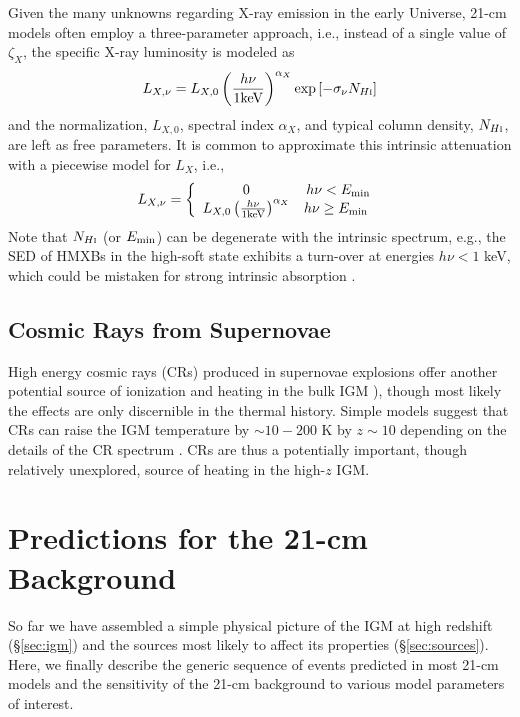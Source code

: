 Given the many unknowns regarding X-ray emission in the early Universe, 21-cm models often employ a three-parameter approach, i.e., instead of a single value of $\zeta_X$, the specific X-ray luminosity is modeled as 
\begin{equation}
	L_{X,\nu} = L_{X,0} \left(\frac{h \nu}{1 \mathrm{keV}} \right)^{\alpha_X} \exp\left[-\sigma_{\nu} N_{H\textsc{i}} \right]
\end{equation}
and the normalization, $L_{X,0}$, spectral index $\alpha_X$, and typical column density, $N_{H\textsc{i}}$, are left as free parameters. It is common to approximate this intrinsic attenuation with a piecewise model for $L_X$, i.e., 
\begin{align}
L_{X,\nu} = \left\{ \begin{array}{cc} 
                0 & h\nu < E_{\min} \\
                L_{X,0} \left(\frac{h \nu}{1 \mathrm{keV}} \right)^{\alpha_X} & h\nu \geq E_{\min} \
                \end{array} \right.
\end{align}
Note that $N_{H\textsc{i}}$ (or $E_{\min}$) can be degenerate with the intrinsic spectrum, e.g., the SED of HMXBs in the high-soft state exhibits a turn-over at energies $h\nu < 1$ keV, which could be mistaken for strong intrinsic absorption \cite{Mirocha2014}.


\subsection{Cosmic Rays from Supernovae}
High energy cosmic rays (CRs) produced in supernovae explosions offer another potential source of ionization and heating in the bulk IGM \cite{Nath1993,Sazonov2015,Leite2017}), though most likely the effects are only discernible in the thermal history. Simple models suggest that CRs can raise the IGM temperature by $\sim 10-200$ K by $z \sim 10$ depending on the details of the CR spectrum \cite{Leite2017}. CRs are thus a potentially important, though relatively unexplored, source of heating in the high-$z$ IGM.

\section{Predictions for the 21-cm Background} \label{sec:predictions}
So far we have assembled a simple physical picture of the IGM at high redshift (\S\ref{sec:igm}) and the sources most likely to affect its properties (\S\ref{sec:sources}). Here, we finally describe the generic sequence of events predicted in most 21-cm models and the sensitivity of the 21-cm background to various model parameters of interest. 

